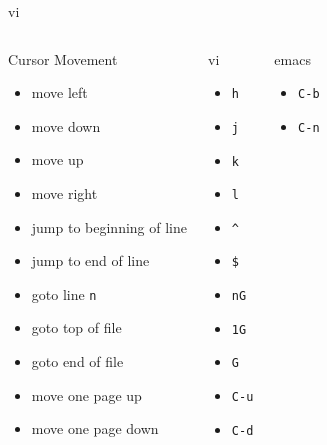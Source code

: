 \documentclass[10pt,t]{beamer}
\begin{document}
\begin{frame}[allowframebreaks]
{\begin{columns}[t]
\begin{exampleblock}{vi}
\begin{itemize}
    \end{itemize}
    \end{exampleblock}
  \end{columns}
  }
  \framebreak
  \vspace{-0.6cm}
  {\scriptsize
  \begin{columns}
    \begin{exampleblock}{Cursor Movement}
    \begin{itemize}
      \item move left 
      \item move down
      \item move up
      \item move right
      \item jump to beginning of line
      \item jump to end of line
      \item goto line \texttt{n}
      \item goto top of file
      \item goto end of file
      \item move one page up
      \item move one page down
    \end{itemize}
    \end{exampleblock}
    \begin{exampleblock}{vi}
    \begin{itemize}
      \item \texttt{h}
      \item \texttt{j}
      \item \texttt{k}
      \item \texttt{l}
      \item \texttt{\^}
      \item \texttt{\$}
      \item \texttt{nG}
      \item \texttt{1G}
      \item \texttt{G}
      \item \texttt{C-u}
      \item \texttt{C-d}
    \end{itemize}
    \end{exampleblock}
    \begin{exampleblock}{emacs}
    \begin{itemize}
      \item \texttt{C-b}
      \item \texttt{C-n}

\end{itemize}
\end{exampleblock}
\end{columns}}
\end{frame}
\end{document}
